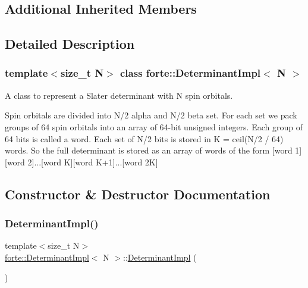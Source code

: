 \subsection*{Additional Inherited Members}


\subsection{Detailed Description}
\subsubsection*{template$<$size\+\_\+t N$>$\newline
class forte\+::\+Determinant\+Impl$<$ N $>$}

A class to represent a Slater determinant with N spin orbitals. 

Spin orbitals are divided into N/2 alpha and N/2 beta set. For each set we pack groups of 64 spin orbitals into an array of 64-\/bit unsigned integers. Each group of 64 bits is called a word. Each set of N/2 bits is stored in K = ceil(N/2 / 64) words. So the full determinant is stored as an array of words of the form \mbox{[}word 1\mbox{]}\mbox{[}word 2\mbox{]}...\mbox{[}word K\mbox{]}\mbox{[}word K+1\mbox{]}...\mbox{[}word 2K\mbox{]} 

\subsection{Constructor \& Destructor Documentation}
\mbox{\label{classforte_1_1_determinant_impl_a7c8dfa806c2a2991024ae0fd2c041616}} 
\subsubsection{\texorpdfstring{Determinant\+Impl()}{DeterminantImpl()}\hspace{0.1cm}{\footnotesize\ttfamily [1/4]}}
{\footnotesize\ttfamily template$<$size\+\_\+t N$>$ \\
\mbox{\hyperlink{classforte_1_1_determinant_impl}{forte\+::\+Determinant\+Impl}}$<$ N $>$\+::\mbox{\hyperlink{classforte_1_1_determinant_impl}{Determinant\+Impl}} (\begin{DoxyParamCaption}{ }\end{DoxyParamCaption})\hspace{0.3cm}{\ttfamily [inline]}}



